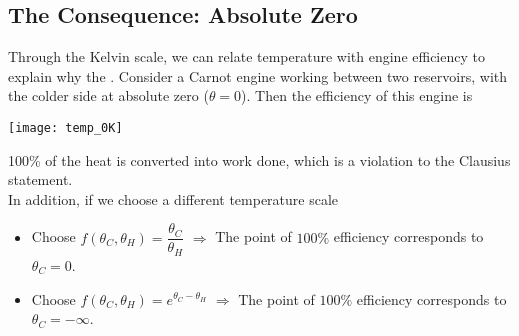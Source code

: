\documentclass[class=article, crop=false, 12pt]{standalone}
\begin{document}

\subsection{The Consequence: Absolute Zero}

Through the Kelvin scale,
we can relate temperature with engine efficiency to explain why the . 
Consider a Carnot engine working between two reservoirs,
with the colder side at absolute zero ($\theta=0$).
Then the efficiency of this engine is

\begin{center}
    \begin{minipage}{0.3\linewidth}
    \end{minipage}
    \hspace{0.05\textwidth}
    \begin{minipage}{0.3\linewidth}
        \centering
        \texttt{[image: temp\_0K]}
    \end{minipage}
\end{center}

100\% of the heat is converted into work done,
which is a violation to the Clausius statement.\\

In addition, if we choose a different temperature scale 
\begin{itemize}
    \item Choose $f(\theta_C,\theta_H) = \dfrac{\theta_C}{\theta_H}$ \quad$\Rightarrow$\quad 
    The point of $100\%$ efficiency corresponds to $\theta_C=0$.

    \item Choose $f(\theta_C,\theta_H) = e^{\theta_C - \theta_H}$ \quad$\Rightarrow$\quad 
    The point of $100\%$ efficiency corresponds to $\theta_C=-\infty$.
\end{itemize}
\end{document}
